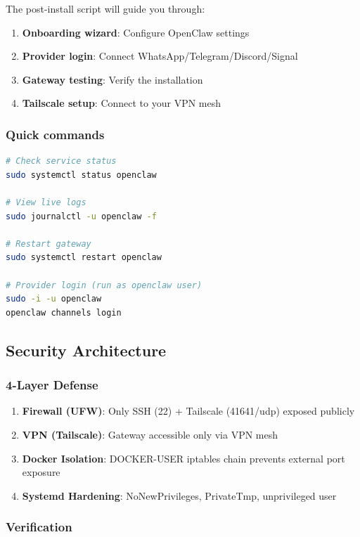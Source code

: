 The post-install script will guide you through:

\begin{enumerate}
  \item \textbf{Onboarding wizard}: Configure OpenClaw settings
  \item \textbf{Provider login}: Connect WhatsApp/Telegram/Discord/Signal
  \item \textbf{Gateway testing}: Verify the installation
  \item \textbf{Tailscale setup}: Connect to your VPN mesh
\end{enumerate}


\subsubsection{Quick commands}


\begin{lstlisting}[language=bash]
# Check service status
sudo systemctl status openclaw

# View live logs
sudo journalctl -u openclaw -f

# Restart gateway
sudo systemctl restart openclaw

# Provider login (run as openclaw user)
sudo -i -u openclaw
openclaw channels login
\end{lstlisting}


\subsection{Security Architecture}


\subsubsection{4-Layer Defense}


\begin{enumerate}
  \item \textbf{Firewall (UFW)}: Only SSH (22) + Tailscale (41641/udp) exposed publicly
  \item \textbf{VPN (Tailscale)}: Gateway accessible only via VPN mesh
  \item \textbf{Docker Isolation}: DOCKER-USER iptables chain prevents external port exposure
  \item \textbf{Systemd Hardening}: NoNewPrivileges, PrivateTmp, unprivileged user
\end{enumerate}


\subsubsection{Verification}


